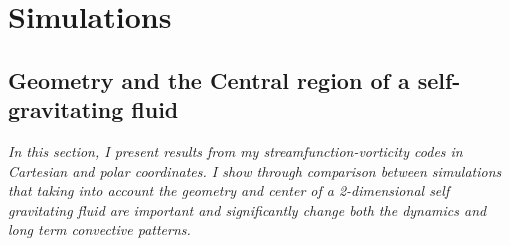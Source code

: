 \documentclass{article}
\begin{document}
\section*{Simulations}


\subsection*{Geometry and the Central region of a self-gravitating fluid}
{\it{In this section, I present results from my streamfunction-vorticity codes in Cartesian and polar coordinates. I show through comparison between simulations that taking into account the geometry and center of a 2-dimensional self gravitating fluid are important and significantly change both the dynamics and long term convective patterns.}}
\vspace{0.3cm}
\newline
\end{document}
